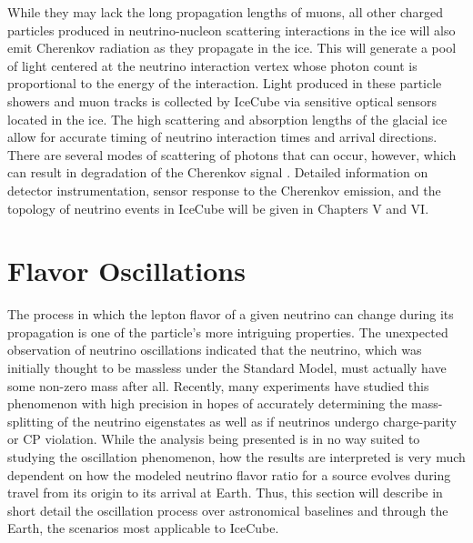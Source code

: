 \documentclass{gatech-thesis}
\begin{document}
While they may lack the long propagation lengths of muons, all other charged particles produced in neutrino-nucleon scattering interactions in the ice will also emit Cherenkov radiation as they propagate in the ice. This will generate a pool of light centered at the neutrino interaction vertex whose photon count is proportional to the energy of the interaction. Light produced in these particle showers and muon tracks is collected by IceCube via sensitive optical sensors located in the ice. The high scattering and absorption lengths of the glacial ice allow for accurate timing of neutrino interaction times and arrival directions. There are several modes of scattering of photons that can occur, however, which can result in degradation of the Cherenkov signal \cite{2013arXiv1301.5361I}. Detailed information on detector instrumentation, sensor response to the Cherenkov emission, and the topology of neutrino events in IceCube will be given in Chapters V and VI.


\section{Flavor Oscillations}
The process in which the lepton flavor of a given neutrino can change during its propagation is one of the particle's more intriguing properties. The unexpected observation of neutrino oscillations indicated that the neutrino, which was initially thought to be massless under the Standard Model, must actually have some non-zero mass after all. Recently, many experiments have studied this phenomenon with high precision in hopes of accurately determining the mass-splitting of the neutrino eigenstates as well as if neutrinos undergo charge-parity or CP violation. While the analysis being presented is in no way suited to studying the oscillation phenomenon, how the results are interpreted is very much dependent on how the modeled neutrino flavor ratio for a source evolves during travel from its origin to its arrival at Earth. Thus, this section will describe in short detail the oscillation process over astronomical baselines and through the Earth, the scenarios most applicable to IceCube.
\end{document}
